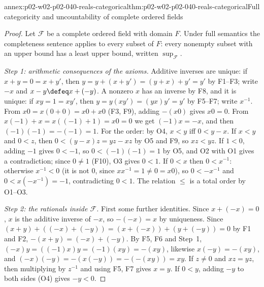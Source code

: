 \begin{annexitem}{annex:p02-w02-p02-040-reals-categorical}{thm:p02-w02-p02-040-reals-categorical}{Full categoricity and uncountability of complete ordered fields}
\begin{proof}
Let \(\mathcal F\) be a complete ordered field with domain \(F\).  Under
full semantics the completeness sentence applies to every subset of \(F\):
every nonempty subset with an upper bound has a least upper bound, written
\(\sup_{\mathcal F}\).

\emph{Step 1: arithmetic consequences of the axioms.}  Additive inverses
are unique: if \(x+y=0=x+y'\), then \(y=y+(x+y')=(y+x)+y'=y'\) by
F1--F3; write \(-x\) and \(x-y\defeq x+(-y)\).  A nonzero \(x\) has an inverse by F8, and it is
unique: if \(xy=1=xy'\), then \(y=y(xy')=(yx)y'=y'\) by F5--F7; write
\(x^{-1}\).  From \(x0=x(0+0)=x0+x0\) (F3, F9),
adding \(-(x0)\) gives \(x0=0\).  From
\(x(-1)+x=x((-1)+1)=x0=0\) we get \((-1)x=-x\), and then
\((-1)(-1)=-(-1)=1\).  For the order: by O4, \(x<y\) iff \(0<y-x\).  If
\(x<y\) and \(0<z\), then \(0<(y-x)z=yz-xz\) by O5 and F9, so \(xz<yz\).
If \(1<0\), adding \(-1\) gives \(0<-1\), so \(0<(-1)(-1)=1\) by O5,
and O2 with O1 gives a contradiction; since \(0\neq1\) (F10), O3 gives
\(0<1\).  If \(0<x\) then \(0<x^{-1}\): otherwise \(x^{-1}<0\) (it is not
\(0\), since \(x x^{-1}=1\neq0=x0\)), so \(0<-x^{-1}\) and
\(0<x(-x^{-1})=-1\), contradicting \(0<1\).  The relation \(\le\) is a
total order by O1--O3.

\emph{Step 2: the rationals inside \(\mathcal F\).}  First some further
identities.  Since \(x+(-x)=0\), \(x\) is the additive inverse of \(-x\), so
\(-(-x)=x\) by uniqueness.  Since \((x+y)+((-x)+(-y))=(x+(-x))+(y+(-y))=0\) by
F1 and F2, \(-(x+y)=(-x)+(-y)\).  By F5, F6 and Step~1,
\((-x)y=((-1)x)y=(-1)(xy)=-(xy)\), likewise \(x(-y)=-(xy)\), and
\((-x)(-y)=-(x(-y))=-(-(xy))=xy\).  If \(z\neq0\) and \(xz=yz\), then
multiplying by \(z^{-1}\) and using F5, F7 gives \(x=y\).  If \(0<y\), adding
\(-y\) to both sides (O4) gives \(-y<0\).


\end{proof}
\end{annexitem}
